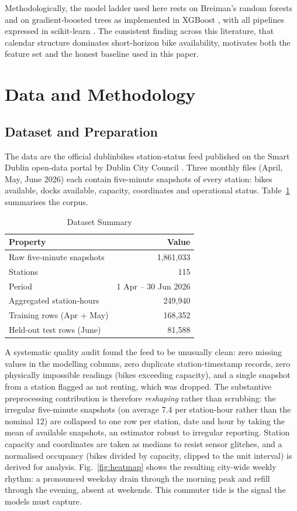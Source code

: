 \documentclass[conference]{IEEEtran}
\begin{document}
Methodologically, the model ladder used here rests on Breiman's random forests \cite{b7} and on gradient-boosted trees as implemented in XGBoost \cite{b8}, with all pipelines expressed in scikit-learn \cite{b9}. The consistent finding across this literature, that calendar structure dominates short-horizon bike availability, motivates both the feature set and the honest baseline used in this paper.

\section{Data and Methodology}
\subsection{Dataset and Preparation}
The data are the official dublinbikes station-status feed published on the Smart Dublin open-data portal by Dublin City Council \cite{b10}. Three monthly files (April, May, June 2026) each contain five-minute snapshots of every station: bikes available, docks available, capacity, coordinates and operational status. Table~\ref{tab:data} summarises the corpus.

\begin{table}[htbp]
\caption{Dataset Summary}
\begin{center}
\begin{tabular}{lr}
\hline
\textbf{Property} & \textbf{Value} \\
\hline
Raw five-minute snapshots & 1,861,033 \\
Stations & 115 \\
Period & 1 Apr -- 30 Jun 2026 \\
Aggregated station-hours & 249,940 \\
Training rows (Apr + May) & 168,352 \\
Held-out test rows (June) & 81,588 \\
\hline
\end{tabular}
\label{tab:data}
\end{center}
\end{table}

A systematic quality audit found the feed to be unusually clean: zero missing values in the modelling columns, zero duplicate station-timestamp records, zero physically impossible readings (bikes exceeding capacity), and a single snapshot from a station flagged as not renting, which was dropped. The substantive preprocessing contribution is therefore \emph{reshaping} rather than scrubbing: the irregular five-minute snapshots (on average 7.4 per station-hour rather than the nominal 12) are collapsed to one row per station, date and hour by taking the mean of available snapshots, an estimator robust to irregular reporting. Station capacity and coordinates are taken as medians to resist sensor glitches, and a normalised occupancy (bikes divided by capacity, clipped to the unit interval) is derived for analysis. Fig.~\ref{fig:heatmap} shows the resulting city-wide weekly rhythm: a pronounced weekday drain through the morning peak and refill through the evening, absent at weekends. This commuter tide is the signal the models must capture.
\end{document}
